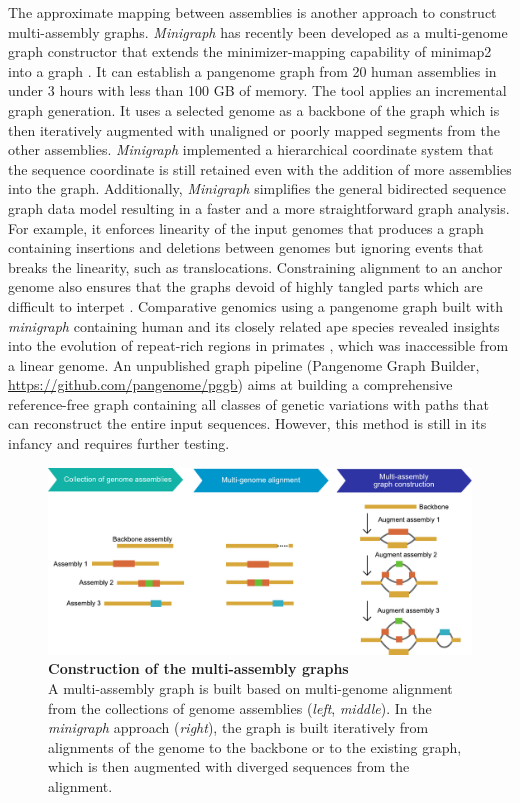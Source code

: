 \documentclass[../main.tex]{subfiles}
\begin{document}
The approximate mapping between assemblies is another approach to construct multi-assembly graphs. \emph{Minigraph} \citep{li2020design} has recently been developed as a multi-genome graph constructor that extends the minimizer-mapping capability of minimap2 into a graph \citep{li2018minimap2}. It can establish a pangenome graph from 20 human assemblies in under 3 hours with less than 100 GB of memory. The tool applies an incremental graph generation. It uses  a selected genome as a backbone of the graph which is then iteratively augmented with unaligned or poorly mapped segments from the other assemblies. \emph{Minigraph} implemented a hierarchical coordinate system that the sequence coordinate is still retained even with the addition of more assemblies into the graph. Additionally, \emph{Minigraph} simplifies the general bidirected sequence graph data model resulting in a faster and a more straightforward graph analysis. For example, it enforces linearity of the input genomes that produces a graph containing insertions and deletions between genomes but ignoring events that breaks the linearity, such as translocations. Constraining alignment to an anchor genome also ensures that the graphs devoid of highly tangled parts which are difficult to interpet \citep{Lei2021}. Comparative genomics using a pangenome graph built with \emph{minigraph} containing human and its closely related ape species revealed insights into the evolution of repeat-rich regions in primates \citep{li2020design}, which was inaccessible from a linear genome. An unpublished graph pipeline (Pangenome Graph Builder, \url{https://github.com/pangenome/pggb}) aims at building a comprehensive reference-free graph containing all classes of genetic variations with paths that can reconstruct the entire input sequences. However, this method is still in its infancy and requires further testing. \\

\begin{figure}[!htb]
    \centering
    \includegraphics[width=\textwidth]{intro/fig7.pdf}
        \vspace{3mm}
        \caption[Construction of the multi-assembly graphs]{\textbf{Construction of the multi-assembly graphs} \\
        \footnotesize{A multi-assembly graph is built based on multi-genome alignment from the collections of genome assemblies (\emph{left}, \emph{middle}). In the \emph{minigraph} approach (\emph{right}), the graph is built iteratively from alignments of the genome to the backbone or to the existing graph, which is then augmented with diverged sequences from the alignment.}}
        \label{fig17:multi}
\end{figure}
\end{document}
